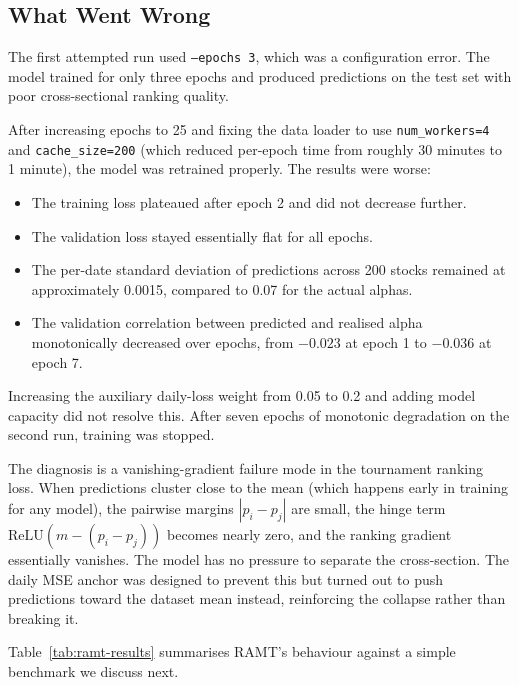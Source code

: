 \documentclass[conference]{IEEEtran}
\begin{document}
\subsection{What Went Wrong}

The first attempted run used \texttt{--epochs 3}, which was a configuration error. The model trained for only three epochs and produced predictions on the test set with poor cross-sectional ranking quality.

After increasing epochs to 25 and fixing the data loader to use \texttt{num\_workers=4} and \texttt{cache\_size=200} (which reduced per-epoch time from roughly 30 minutes to 1 minute), the model was retrained properly. The results were worse:

\begin{itemize}
    \item The training loss plateaued after epoch 2 and did not decrease further.
    \item The validation loss stayed essentially flat for all epochs.
    \item The per-date standard deviation of predictions across 200 stocks remained at approximately 0.0015, compared to 0.07 for the actual alphas.
    \item The validation correlation between predicted and realised alpha monotonically decreased over epochs, from $-0.023$ at epoch 1 to $-0.036$ at epoch 7.
\end{itemize}

Increasing the auxiliary daily-loss weight from 0.05 to 0.2 and adding model capacity did not resolve this. After seven epochs of monotonic degradation on the second run, training was stopped.

The diagnosis is a vanishing-gradient failure mode in the tournament ranking loss. When predictions cluster close to the mean (which happens early in training for any model), the pairwise margins $|p_i - p_j|$ are small, the hinge term $\text{ReLU}(m - (p_i - p_j))$ becomes nearly zero, and the ranking gradient essentially vanishes. The model has no pressure to separate the cross-section. The daily MSE anchor was designed to prevent this but turned out to push predictions toward the dataset mean instead, reinforcing the collapse rather than breaking it.

Table~\ref{tab:ramt-results} summarises RAMT's behaviour against a simple benchmark we discuss next.
\end{document}
